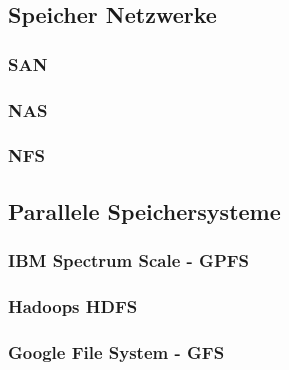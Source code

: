 \subsection{Speicher Netzwerke}
\subsubsection{SAN}
\subsubsection{NAS}
\subsubsection{NFS}

\subsection{Parallele Speichersysteme}
\subsubsection{IBM Spectrum Scale - GPFS}
\subsubsection{Hadoops HDFS}
\subsubsection{Google File System - GFS}